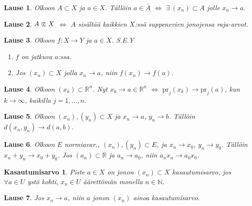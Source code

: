 \documentclass[landscape,a4paper,9pt]{extarticle}
\newcommand\cls{\mathrel{\ooalign{$\subset$\cr
\hidewidth\raise.225ex\hbox{$\text{{\scriptsize c}}\mkern2mu$}\cr}}}
\theoremstyle{customtheoremstyle}
\newtheorem*{theorem}{Lause}
\begin{document}
\begin{multicols*}{3}
\begin{theorem}
  Olkoon $A \subset X$ ja $a \in X$. Tällöin $a \in \bar{A}$ $\iff$ $\exists \:
  (x_n) \subset A$ jolle $x_n \rightarrow a$.
\end{theorem}

\begin{theorem}
  $A \cls X$ $\iff$ $A$ sisältää kaikkien $X$:ssä suppenevien jonojensa
  raja-arvot.
\end{theorem}

\begin{theorem}
  Olkoon $f: X \rightarrow Y$ ja $a \in X$. S.E.Y
  \begin{enumerate}
    \item{$f$ on jatkuva $a$:ssa.}
    \item{Jos $(x_n) \subset X$ jolla $x_n \rightarrow a$, niin $f(x_n)
      \rightarrow f(a)$.}
  \end{enumerate}
\end{theorem}

\begin{theorem}
  Olkoon $(x_k) \subset \mathbb{R}^n$. Nyt $x_k \rightarrow a \in \mathbb{R}^n$
  $\iff$ $\text{pr}_j(x_k) \rightarrow \text{pr}_j(a)$, kun $k \rightarrow
  \infty$, kaikilla $j = 1,...,n$.
\end{theorem}

\begin{theorem}
  Olkoon $(x_n), (y_n) \subset X$ ja $x_n \rightarrow a$, $y_n \rightarrow b$.
  Tällöin $d(x_n, y_n) \rightarrow d(a,b)$.
\end{theorem}

\begin{theorem}
  Olkoon $E$ normiavar., $(x_n), (y_n) \subset E$, ja $x_n \rightarrow x_0$,
  $y_n \rightarrow y_0$. Tällöin $x_n + y_n \rightarrow x_0 + y_0$. Jos $(a_n)
  \subset \mathbb{R}$ ja $a_n \rightarrow a_0$, niin $a_n x_n \rightarrow a_0
  x_0$.
\end{theorem}

\newtheorem*{defn:kasautumisarvo}{Kasautumisarvo}
\begin{defn:kasautumisarvo}
  Piste $a \in X$ on jonon $(x_n) \subset X$ kasautumisarvo, jos $\forall a \in
  U$ ystö kohti, $x_n \in U$ äärettömän monella $n \in \mathbb{N}$.
\end{defn:kasautumisarvo}

\begin{theorem}
  Jos $x_n \rightarrow a$, niin $a$ jonon $(x_n)$ ainoa kasautumisarvo.
\end{theorem}


\end{multicols*}
\end{document}
